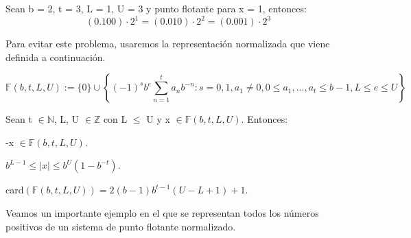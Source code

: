 \begin{ejemplo}
Sean b = 2, t = 3, L = 1, U = 3 y punto flotante para x = 1, entonces:
\[ (0.100) \cdot 2^1 = (0.010) \cdot 2^2 = (0.001) \cdot 2^3 \]
\end{ejemplo}

Para evitar este problema, usaremos la representación normalizada que viene definida a continuación.

\begin{ndef}
\[ \mathbb{F} (b,t,L,U) := \lbrace 0 \rbrace \cup \left\lbrace (-1)^sb^e \sum_{n=1}^t a_nb^{-n} : s = 0,1, a_1 \neq 0, 0 \leq a_1,...,a_t \leq b - 1, L \leq e \leq U \right\rbrace \]
\end{ndef}

\begin{nprop}
Sean t $\in \mathbb{N}$, L, U $\in \mathbb{Z}$ con L $\leq$ U y x $\in \mathbb{F} (b,t,L,U)$. Entonces:
	\begin{nlist}
	\item -x $\in \mathbb{F} (b,t,L,U)$.
	\item $b^{L-1} \leq \vert x \vert \leq b^U(1 - b^{-t})$.
	\item card$( \mathbb{F} (b,t,L,U)) = 2(b-1)b^{t-1}(U-L+1)+1$.
	\end{nlist}
\end{nprop}

Veamos un importante ejemplo en el que se representan todos los números positivos de un sistema de punto flotante normalizado.

